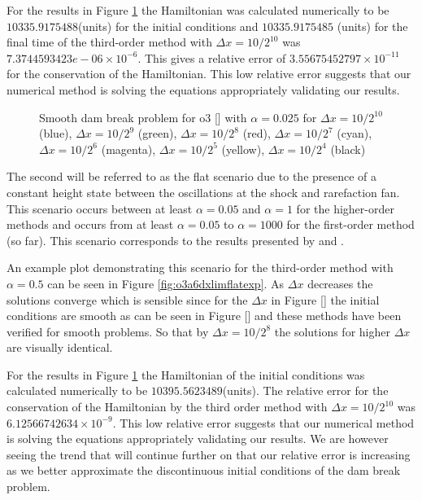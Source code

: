 \documentclass[SingleSpace,12pt,Proceedings]{Serre_ASCE}
\begin{document}
For the results in Figure \ref{fig:o3a1dxlimflatexp} the Hamiltonian was calculated numerically to be $10335.9175488$(units) for the initial conditions and $10335.9175485$ (units) for the final time of the third-order method with $\Delta x = 10/2^{10}$ was $7.3744593423e-06 \times 10^{-6}$. This gives a relative error of $3.55675452797 \times 10^{-11}$ for the conservation of the Hamiltonian. This low relative error suggests that our numerical method is solving the equations appropriately validating our results. 

\begin{figure}
\centering
{}
\caption{Smooth dam break problem for o3 [] with $\alpha = 0.025$ for $\Delta x = 10/2^{10}$ (blue), $\Delta x = 10/2^9$ (green), $\Delta x = 10/2^8$ (red), $\Delta x = 10/2^7$ (cyan), $\Delta x = 10/2^6$ (magenta), $\Delta x = 10/2^5$ (yellow), $\Delta x = 10/2^4$ (black)}
\label{fig:o3a1dxlimflatexp}
\end{figure}

The second will be referred to as the flat scenario due to the presence of a constant height state between the oscillations at the shock and rarefaction fan. This scenario occurs between at least $\alpha = 0.05 $ and $\alpha = 1$ for the higher-order methods and occurs from at least $\alpha = 0.05 $ to $\alpha = 1000 $ for the first-order method (so far). This scenario corresponds to the results presented by  and . 

An example plot demonstrating this scenario for the third-order method with $\alpha = 0.5$ can be seen in Figure \ref{fig:o3a6dxlimflatexp}. As $\Delta x$ decreases the solutions converge which is sensible since for the $\Delta x$ in Figure [] the initial conditions are smooth as can be seen in Figure [] and these methods have been verified for smooth problems. So that by $\Delta x = 10 / 2^8$ the solutions for higher $\Delta x$ are visually identical. 

For the results in Figure \ref{fig:o3a1dxlimflatexp} the Hamiltonian of the initial conditions was calculated numerically to be $10395.5623489$(units).  The relative error for the conservation of the Hamiltonian by the third order method with $\Delta x = 10/2^{10}$ was $6.12566742634 \times 10^{-9}$. This low relative error suggests that our numerical method is solving the equations appropriately validating our results. We are however seeing the trend that will continue further on that our relative error is increasing as we better approximate the discontinuous initial conditions of the dam break problem.  
\end{document}
